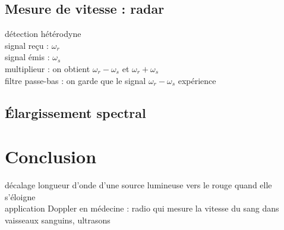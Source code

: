 \subsection{Mesure de vitesse : radar}
détection hétérodyne  \\
signal reçu : $\omega_r$ \\
signal émis : $\omega_s$ \\
multiplieur : on obtient $\omega_r-\omega_s$ et $\omega_r+\omega_s$ \\
filtre passe-bas : on garde que le signal $\omega_r-\omega_s$
expérience

\subsection{Élargissement spectral}



\section*{Conclusion}

décalage longueur d'onde d'une source lumineuse vers le rouge quand elle s'éloigne \\
application Doppler en médecine : radio qui mesure la vitesse du sang dans vaisseaux sanguins, ultrasons \\


